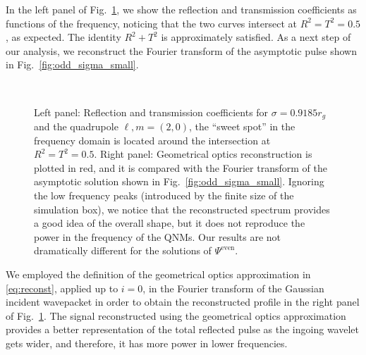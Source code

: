 \documentclass[article,aps,nofootinbib,twocolumn,superscriptaddress]{revtex4-1}
\begin{document}
In the left panel of Fig.~\ref{fig:RT_reconst}, we show the reflection and transmission coefficients as functions of the frequency, noticing that the two curves intersect at $R^2=T^2=0.5$, as expected. The identity $R^2+T^2$ is approximately satisfied. As a next step of our analysis, we reconstruct the Fourier transform of the asymptotic pulse shown in Fig.~\ref{fig:odd_sigma_small}.  
\begin{figure}[t!]
\centering
{} \,
\caption{\label{fig:RT_reconst} Left panel: Reflection and transmission coefficients for $\sigma=0.9185r_g$ and the quadrupole $\ell,m=(2,0)$, the ``sweet spot'' in the frequency domain is located around the intersection at $R^2=T^2=0.5$. Right panel: Geometrical optics reconstruction is plotted in red, and it is compared with the Fourier transform of the asymptotic solution shown in Fig.~\ref{fig:odd_sigma_small}. Ignoring the low frequency peaks (introduced by the finite size of the simulation box), we notice that the reconstructed spectrum provides a good idea of the overall shape, but it does not reproduce the power in the frequency of the QNMs. Our results are not dramatically different for the solutions of $\Psi^{\mathrm{even}}$.} 
\end{figure}
\par
We employed the definition of the geometrical optics approximation in \eqref{eq:reconst}, applied up to $i=0$, in the Fourier transform of the Gaussian incident wavepacket in order to obtain the reconstructed profile in the right panel of Fig.~\ref{fig:RT_reconst}. The signal reconstructed using the geometrical optics approximation provides a better representation of the total reflected pulse as the ingoing wavelet gets wider, and therefore, it has more power in lower frequencies. 
\end{document}
